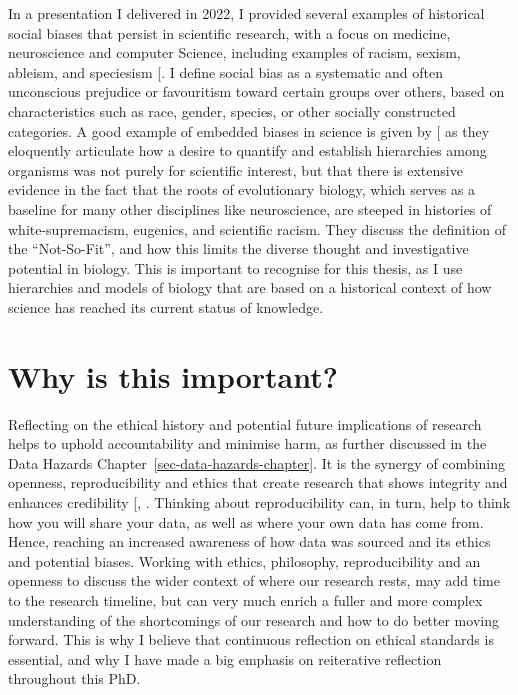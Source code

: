 \documentclass[
  11pt,
  letterpaper,
]{scrreprt}
\begin{document}
In a presentation I delivered in 2022, I provided several examples of
historical social biases that persist in scientific research, with a
focus on medicine, neuroscience and computer Science, including examples
of racism, sexism, ableism, and speciesism
{[}\citeproc{ref-garcia2022Thinkinga}{378}{]}. I define social bias as a
systematic and often unconscious prejudice or favouritism toward certain
groups over others, based on characteristics such as race, gender,
species, or other socially constructed categories. A good example of
embedded biases in science is given by
{[}\citeproc{ref-branch2022Discussionsa}{418}{]} as they eloquently
articulate how a desire to quantify and establish hierarchies among
organisms was not purely for scientific interest, but that there is
extensive evidence in the fact that the roots of evolutionary biology,
which serves as a baseline for many other disciplines like neuroscience,
are steeped in histories of white-supremacism, eugenics, and scientific
racism. They discuss the definition of the ``Not-So-Fit'', and how this
limits the diverse thought and investigative potential in biology. This
is important to recognise for this thesis, as I use hierarchies and
models of biology that are based on a historical context of how science
has reached its current status of knowledge.

\section{Why is this important?}\label{why-is-this-important}

Reflecting on the ethical history and potential future implications of
research helps to uphold accountability and minimise harm, as further
discussed in the Data Hazards Chapter~\ref{sec-data-hazards-chapter}. It
is the synergy of combining openness, reproducibility and ethics that
create research that shows integrity and enhances credibility
{[},
\citeproc{ref-zhaksylyk2023Research}{420}{]}. Thinking about
reproducibility can, in turn, help to think how you will share your
data, as well as where your own data has come from. Hence, reaching an
increased awareness of how data was sourced and its ethics and potential
biases. Working with ethics, philosophy, reproducibility and an openness
to discuss the wider context of where our research rests, may add time
to the research timeline, but can very much enrich a fuller and more
complex understanding of the shortcomings of our research and how to do
better moving forward. This is why I believe that continuous reflection
on ethical standards is essential, and why I have made a big emphasis on
reiterative reflection throughout this PhD.
\end{document}
